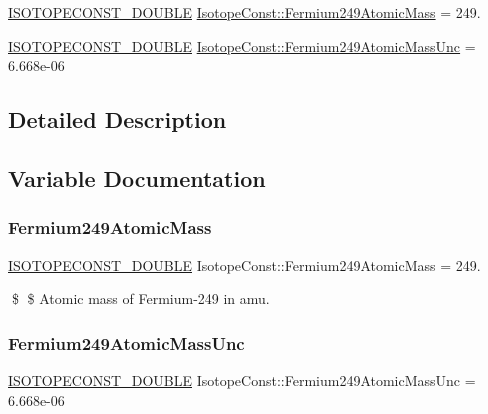 \begin{DoxyCompactItemize}
\item 
\mbox{\hyperlink{group___isotope_const-_macros_ga8f45a7272ce02c0b4c65c44636ed719a}{I\+S\+O\+T\+O\+P\+E\+C\+O\+N\+S\+T\+\_\+\+D\+O\+U\+B\+LE}} \mbox{\hyperlink{group___isotope_const-_fermium-_fm249_gad820eecc83f1d86ddd82383e0406db8b}{Isotope\+Const\+::\+Fermium249\+Atomic\+Mass}} = 249.
\item 
\mbox{\hyperlink{group___isotope_const-_macros_ga8f45a7272ce02c0b4c65c44636ed719a}{I\+S\+O\+T\+O\+P\+E\+C\+O\+N\+S\+T\+\_\+\+D\+O\+U\+B\+LE}} \mbox{\hyperlink{group___isotope_const-_fermium-_fm249_gaa4fdfe28f52a3909259f0ec8b1be2d4e}{Isotope\+Const\+::\+Fermium249\+Atomic\+Mass\+Unc}} = 6.\+668e-\/06
\end{DoxyCompactItemize}


\subsection{Detailed Description}


\subsection{Variable Documentation}
\mbox{\label{group___isotope_const-_fermium-_fm249_gad820eecc83f1d86ddd82383e0406db8b}} 
\subsubsection{\texorpdfstring{Fermium249\+Atomic\+Mass}{Fermium249AtomicMass}}
{\footnotesize\ttfamily \mbox{\hyperlink{group___isotope_const-_macros_ga8f45a7272ce02c0b4c65c44636ed719a}{I\+S\+O\+T\+O\+P\+E\+C\+O\+N\+S\+T\+\_\+\+D\+O\+U\+B\+LE}} Isotope\+Const\+::\+Fermium249\+Atomic\+Mass = 249.}

\$ \$ Atomic mass of Fermium-\/249 in amu. \mbox{\label{group___isotope_const-_fermium-_fm249_gaa4fdfe28f52a3909259f0ec8b1be2d4e}} 
\subsubsection{\texorpdfstring{Fermium249\+Atomic\+Mass\+Unc}{Fermium249AtomicMassUnc}}
{\footnotesize\ttfamily \mbox{\hyperlink{group___isotope_const-_macros_ga8f45a7272ce02c0b4c65c44636ed719a}{I\+S\+O\+T\+O\+P\+E\+C\+O\+N\+S\+T\+\_\+\+D\+O\+U\+B\+LE}} Isotope\+Const\+::\+Fermium249\+Atomic\+Mass\+Unc = 6.\+668e-\/06}

